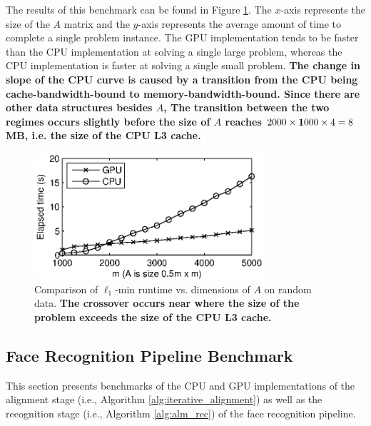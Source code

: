 \documentclass[preprint]{sigplanconf}
\begin{document}
The results of this benchmark can be found in Figure \ref{fig:random_data}.
The $x$-axis represents the size of the $A$ matrix and the $y$-axis represents
the average amount of time to complete a single problem instance.  The GPU
implementation tends to be faster than the CPU implementation at solving a
single large problem, whereas the CPU implementation is faster at solving a
single small problem.  {\bf The change in slope of the CPU curve is caused by a
transition from the CPU being cache-bandwidth-bound to memory-bandwidth-bound.
Since there are other data structures besides $A$, The transition between the
two regimes occurs slightly before the size of $A$ reaches $2000 \times {\boldsymbol{1}}000
\times 4 = 8$ MB, i.e. the size of the CPU L3 cache. }

\begin{figure}
\begin{center}
\includegraphics[width=3.35in]{figures/time_vs_matrix_size_constant_tol}
\end{center} 
\caption{\small Comparison of $\ell_1$-min runtime vs. dimensions of $A$ on random data.  {\bf The crossover
occurs near where the size of the problem exceeds the size of the CPU L3 cache.}} 
\label{fig:random_data}
\end{figure}

\subsection{Face Recognition Pipeline Benchmark} 
\label{sec:benchmark}
This section presents benchmarks of the CPU and GPU implementations of the
alignment stage (i.e., Algorithm
\ref{alg:iterative_alignment}) as well as the recognition stage (i.e., Algorithm \ref{alg:alm_rec}) of the
face recognition pipeline.
\end{document}

